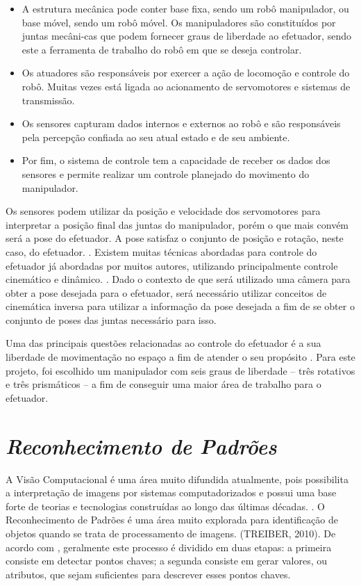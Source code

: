 \begin{itemize}
  \item A estrutura mecânica pode conter base fixa, sendo um robô manipulador, ou base móvel, sendo um robô móvel. Os manipuladores são constituídos por juntas mecâni-cas que podem fornecer graus de liberdade ao efetuador, sendo este a ferramenta de trabalho do robô em que se deseja controlar.
  \item Os atuadores são responsáveis por exercer a ação de locomoção e controle do robô. Muitas vezes está ligada ao acionamento de servomotores e sistemas de transmissão.
  \item Os sensores capturam dados internos e externos ao robô e são responsáveis pela percepção confiada ao seu atual estado e de seu ambiente.
  \item Por fim, o sistema de controle tem a capacidade de receber os dados dos sensores e permite realizar um controle planejado do movimento do manipulador.
\end{itemize}

Os sensores podem utilizar da posição e velocidade dos servomotores para interpretar a posição final das juntas do manipulador, porém o que mais convém será a pose do efetuador. A pose satisfaz o conjunto de posição e rotação, neste caso, do efetuador. \cite{siciliano2010robotics}. Existem muitas técnicas abordadas para controle do efetuador já abordadas por muitos autores, utilizando principalmente controle cinemático e dinâmico. \cite{guimaraes_batista_modelo_2019}. Dado o contexto de que será utilizado uma câmera para obter a pose desejada para o efetuador, será necessário utilizar conceitos de cinemática inversa para utilizar a informação da pose desejada a fim de se obter o conjunto de poses das juntas necessário para isso.
   
Uma das principais questões relacionadas ao controle do efetuador é a sua liberdade de movimentação no espaço a fim de atender o seu propósito \cite{bretherton1999effective}. Para este projeto, foi escolhido um manipulador com seis graus de liberdade – três rotativos e três prismáticos – a fim de conseguir uma maior área de trabalho para o efetuador.


\section{\textit{Reconhecimento de Padrões}}\label{sec:Cap2_RP}

A Visão Computacional é uma área muito difundida atualmente, pois possibilita a interpretação de imagens por sistemas computadorizados e possui uma base forte de teorias e tecnologias construídas ao longo das últimas décadas. \cite{MAIA10}. O Reconhecimento de Padrões é uma área muito explorada para identificação de objetos quando se trata de processamento de imagens. (TREIBER, 2010). De acordo com \cite{SILVA12}, geralmente este processo é dividido em duas etapas: a primeira consiste em detectar pontos chaves; a segunda consiste em gerar valores, ou atributos, que sejam suficientes para descrever esses pontos chaves.


